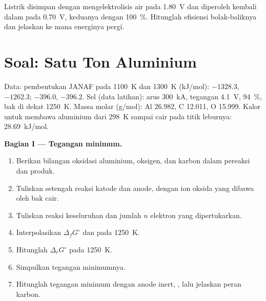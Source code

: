 \begin{exercise}[$\star\star\star$]\label{exo:b2:batteries-electrolysis:12}
Listrik disimpan dengan mengelektrolisis air pada \qty{1.80}{V} dan
diperoleh kembali dalam  pada \qty{0.70}{V}, keduanya dengan
 100~\%. Hitunglah efisiensi bolak-baliknya dan jelaskan
ke mana energinya pergi.
\end{exercise}

\section{Soal: Satu Ton Aluminium}

\begin{problem}
\label{pb:b2:batteries-electrolysis:1}
Data:  pembentukan JANAF pada \qty{1100}{K} dan \qty{1300}{K}
(\unit{kJ/mol}):  $-1328.3$, $-1262.3$;  $-396.0$,
$-396.2$. Sel (data latihan): arus \qty{300}{kA}, tegangan \qty{4.1}{V},
 94~\%, bak di dekat \qty{1250}{K}. Massa molar
(\unit{g/mol}): Al 26.982, C 12.011, O 15.999. Kalor untuk membawa
aluminium dari \qty{298}{K} sampai cair pada titik leburnya:
\qty{28.69}{kJ/mol}.

\medskip
\noindent\textbf{Bagian I --- Tegangan minimum.}
\begin{enumerate}
  \item Berikan bilangan oksidasi aluminium, oksigen, dan karbon dalam
        pereaksi dan produk.
  \item Tuliskan setengah reaksi katode dan anode, dengan ion oksida
         yang dibawa oleh bak cair.
  \item Tuliskan reaksi keseluruhan dan jumlah $n$ elektron yang
        dipertukarkan.
  \item Interpolasikan $\Delta_f G^\circ$  dan  pada
        \qty{1250}{K}.
  \item Hitunglah $\Delta_r G^\circ$ pada \qty{1250}{K}.
  \item Simpulkan tegangan minimumnya.
  \item Hitunglah tegangan minimum dengan anode inert,
        , lalu jelaskan peran karbon.
\end{enumerate}


\end{problem}
